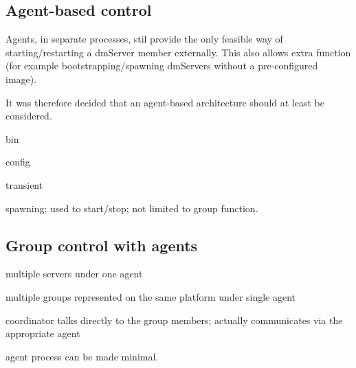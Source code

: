 \documentclass[a4paper,12pt]{article}
\begin{document}
\subsection{Agent-based control}
Agents, in separate processes, stil provide the only feasible way of starting/restarting a dmServer member externally. This also allows extra function (for example bootstrapping/spawning dmServers without a pre-configured image).

It was therefore decided that an agent-based architecture should at least be considered.

bin

config

transient

spawning; used to start/stop; not limited to group function.

\subsection{Group control with agents}
multiple servers under one agent

multiple groups represented on the same platform under single agent

coordinator talks directly to the group members; actually communicates via the appropriate agent

agent process can be made minimal.
\end{document}
